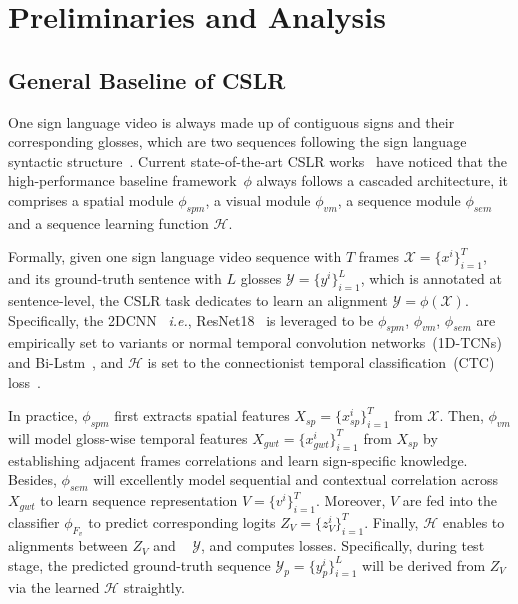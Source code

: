 \documentclass[sigconf]{acmart}
\begin{document}
\section{Preliminaries and Analysis}
\label{sec_pa}

\subsection{General Baseline of CSLR}
\label{sec_base}
One sign language video is always made up of contiguous signs and their corresponding glosses, which are two sequences following the sign language syntactic structure~\cite{sutton1999linguistics}.
Current state-of-the-art CSLR works~\cite{min2021visual,hao2021self,zuo2022c2slr,hu2022temporal,Hu2022SelfEmphasizingNF,hu2023continuous,CVTSLR2023} have noticed that the high-performance baseline framework~$\phi$ always follows a cascaded architecture, it comprises a spatial module $\phi_{spm}$, a visual module $\phi_{vm}$, a sequence module $\phi_{sem}$ and 
a sequence learning function $\mathcal{H}$.

Formally, given one sign language video sequence with $T$ frames $\mathcal{X} =\{x^i\}_{i=1}^T$, and its ground-truth sentence with $L$ glosses $\mathcal{Y} =\{y^i\}_{i=1}^L$, which is annotated at sentence-level, the CSLR task dedicates to learn an alignment $\mathcal{Y} =  \phi(\mathcal{X}) $. 
Specifically, the 2DCNN ~\textit{i.e.}, ResNet18~\cite{inproceedingsResnet} is leveraged to be $\phi_{spm}$, $\phi_{vm}$, $\phi_{sem}$ are empirically set to variants or normal temporal convolution networks~(1D-TCNs)~\cite{min2021visual,hao2021self,zuo2022c2slr,hu2022temporal,chen2022simple,Hu2022SelfEmphasizingNF,hu2023continuous} and Bi-Lstm~\cite{min2021visual,hao2021self,zuo2022c2slr,hu2022temporal,Hu2022SelfEmphasizingNF,hu2023continuous,CVTSLR2023}, and $\mathcal{H}$ is set to the connectionist temporal classification~(CTC) loss~\cite{min2021visual,hao2021self,zuo2022c2slr,chen2022simple,hu2022temporal,Hu2022SelfEmphasizingNF,chen2022two,hu2023continuous,CVTSLR2023}.


In practice, $\phi_{spm}$ first extracts spatial features $X_{sp}=\{x_{sp}^i\}_{i=1}^T$ from $\mathcal{X}$.
Then, ${\phi}_{vm}$  will model gloss-wise temporal features ${X_{gwt}}=\{x_{gwt}^i\}_{i=1}^T$ from $X_{sp}$ by establishing adjacent
frames correlations and learn sign-specific knowledge.
Besides, ${\phi}_{sem}$ will excellently model sequential and contextual correlation across $X_{gwt}$ to learn sequence representation ${V}=\{v^i\}_{i=1}^T$.
Moreover, $V$ are fed into the classifier $\phi_{F_{v}}$ to predict corresponding logits ${Z_{V}}=\{z_{V}^i\}_{i=1}^T$.
Finally, $\mathcal{H}$ enables to alignments between ${Z_{V}}$ and ~ $\mathcal{Y}$, and computes losses.
Specifically, during test stage, the predicted ground-truth sequence ${\mathcal{Y}_{p}}=\{y_p^i\}_{i=1}^L$ will be derived  from ${Z_{V}}$  via the learned $\mathcal{H}$  straightly.
\end{document}

